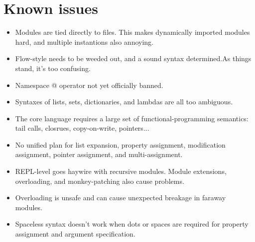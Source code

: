 \chapter{Known issues}

\begin{itemize}
\item Modules are tied directly to files. This makes dynamically imported modules hard, and multiple instantions also annoying.
\item Flow-style needs to be weeded out, and a sound syntax determined.As things stand, it's too confusing.
\item Namespace @ operator not yet officially banned.
\item Syntaxes of lists, sets, dictionaries, and lambdas are all too ambiguous.
\item The core language requires a large set of functional-programming semantics: tail calls, closrues, copy-on-write, pointers...
\item No unified plan for list expansion, property assignment, modification assignment, pointer assignment, and multi-assignment.
\item REPL-level goes haywire with recursive modules. Module extensions, overloading, and monkey-patching also cause problems.
\item Overloading is unsafe and can cause unexpected breakage in faraway modules.
\item Spaceless syntax doesn't work when dots or spaces are required for property assignment and argument specification.
\end{itemize}
